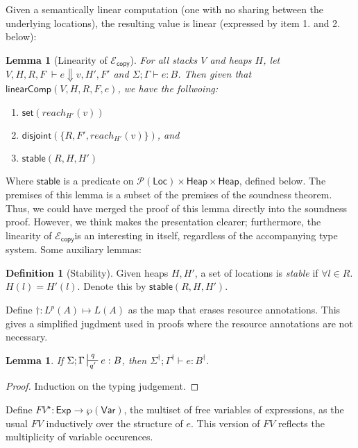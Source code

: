 \documentclass{easychair}
\newcommand{\ms}[1]{\ensuremath{\mathsf{#1}}}
\newcommand{\stable}[1]{\mathsf{stable}(#1)}
\newcommand{\dist}[1]{\mathsf{disjoint}(#1)}
\newcommand{\wfc}[5]{\mathsf{linearComp}(#1,#2,#3,#4,#5)}
\newcommand{\copySem}{\ensuremath{\mathcal{E}_{\ms{copy}}}}
\newtheorem{lemma}[theorem]{Lemma}
\theoremstyle{definition}
\newtheorem{definition}{Definition}
\begin{document}
Given a semantically linear computation 
(one with no sharing between the underlying locations), the resulting value is linear 
(expressed by item 1. and 2. below):
\begin{lemma}[Linearity of \copySem]\label{itm:na}
For all stacks $V$ and heaps $H$, let  $V,H,R,F \; \vdash e \Downarrow v, H', F'$ 
and $\Sigma; \Gamma \vdash e : B$. Then given that $\wfc{V}{H}{R}{F}{e}$, we have the follwoing: 
\begin{enumerate}
\item $\ms{set}(reach_{H'}(v))$
\item $\dist{\{R,F',reach_{H'}(v)\}}$, and
\item $\stable{R,H,H'}$
\end{enumerate}
\end{lemma}

Where $\ms{stable}$ is a predicate on $\mathcal{P}(\ms{Loc}) \times \ms{Heap} \times \ms{Heap}$, defined
below. The premises of this lemma is a subset of the premises of the soundness theorem. 
Thus, we could have
merged the proof of this lemma directly into the soundness proof. However, we think makes the 
presentation clearer; furthermore, the linearity of \copySem is an interesting in itself, 
regardless of the accompanying type system. Some auxiliary lemmas:

\begin{definition}[Stability]
Given heaps $H,H'$, a set of locations is \emph{stable} if $\forall l \in R$. $H(l) = H'(l)$. Denote this by
$\stable{R,H,H'}$.
\end{definition}

Define $\dagger :  L^p(A) \mapsto L(A)$ as the map that erases resource annotations. 
This gives a simplified jugdment 
used in proofs where the resource annotations are not necessary.

\begin{lemma}
\label{a} If $\Sigma; \Gamma \sststile{q'}{q} e : B$, then $\Sigma^{\dagger}; \Gamma^{\dagger} \vdash e : B^{\dagger}$.
\end{lemma}

\begin{proof}
Induction on the typing judgement.
\end{proof}

Define $FV^{\star} : \ms{Exp} \to \wp(\ms{Var})$, the multiset of free variables of expressions,
as the usual $FV$ inductively over the structure of $e$. This version of $FV$ reflects 
the multiplicity of variable occurences.
\end{document}
